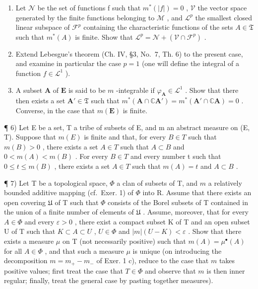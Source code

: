 \begin{enumerate}
\def\labelenumi{\alph{enumi})}
\item
  Let \(\mathcal{N}\) be the set of functions f such that \(m^{*}(|f|)=0\) , \(\mathcal{V}\) the vector space generated by the finite functions belonging to \(\mathcal{M}\) , and \(\mathcal{L}^{p}\) the smallest closed linear subspace of \(\mathcal{F}^{p}\) containing the characteristic functions of the sets \(A\in \mathfrak{T}\) such that \(m^{*}(A)\) is finite. Show that \(\mathcal{L}^{p}=\mathcal{N}+(\mathcal{V}\cap\mathcal{F}^{p})\) .
\item
  Extend Lebesgue's theorem (Ch. IV, §3, No.~7, Th. 6) to the present case, and examine in particular the case \(p = 1\) (one will define the integral of a function \(f \in \mathcal{L}^1\) ).
\item
  A subset \(\mathbf{A}\) of \(\mathbf{E}\) is said to be \(m\) -integrable if \(\varphi_{\mathbf{A}} \in \mathcal{L}^1\) . Show that there then exists a set \(\mathbf{A}' \in \mathfrak{T}\) such that \(m^{*}(\mathbf{A} \cap \mathbb{C}\mathbf{A}') = m^{*}(\mathbf{A}' \cap \mathbb{C}\mathbf{A}) = 0\) . Converse, in the case that \(m(\mathbf{E})\) is finite.
\end{enumerate}

¶ 6) Let E be a set, T a tribe of subsets of E, and m an abstract measure on (E, T). Suppose that \(m(E)\) is finite and that, for every \(B \in T\) such that \(m(B) > 0\) , there exists a set \(A \in T\) such that \(A \subset B\) and \(0 < m(A) < m(B)\) . For every \(B \in T\) and every number t such that \(0 \leqslant t \leqslant m(B)\) , there exists a set \(A \in T\) such that \(m(A) = t\) and \(A \subset B\) .

¶ 7) Let T be a topological space, \(\Phi\) a clan of subsets of T, and \(m\) a relatively bounded additive mapping (cf.~Exer. 1) of \(\Phi\) into R. Assume that there exists an open covering \(\mathfrak{U}\) of T such that \(\Phi\) consists of the Borel subsets of T contained in the union of a finite number of elements of \(\mathfrak{U}\) . Assume, moreover, that for every \(A \in \Phi\) and every \(\varepsilon > 0\) , there exist a compact subset K of T and an open subset U of T such that \(K \subset A \subset U\) , \(U \in \Phi\) and \(|m|(U - K) < \varepsilon\) . Show that there exists a measure \(\mu\) on T (not necessarily positive) such that \(m(A) = \mu^{\bullet}(A)\) for all \(A \in \Phi\) , and that such a measure \(\mu\) is unique (on introducing the decomposition \(m = m_{+} - m_{-}\) of Exer. 1 c), reduce to the case that \(m\) takes positive values; first treat the case that \(T \in \Phi\) and observe that \(m\) is then inner regular; finally, treat the general case by pasting together measures).

